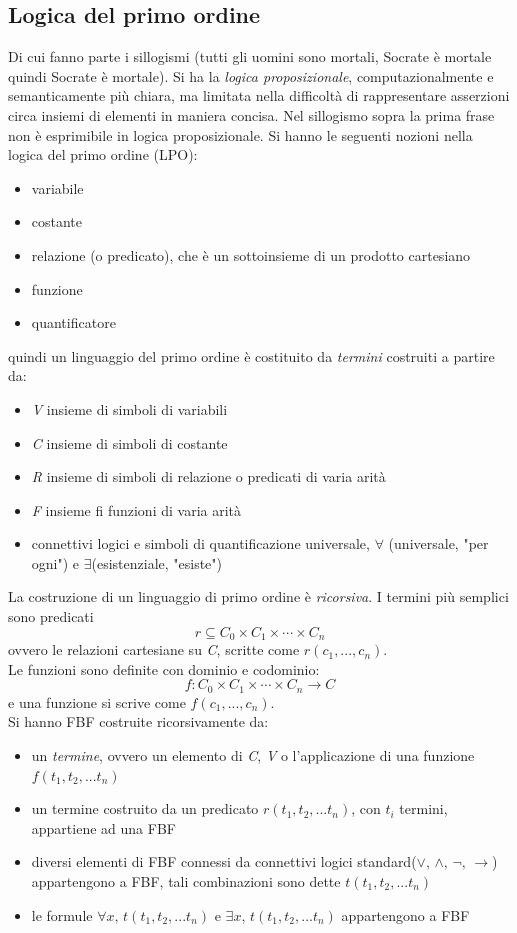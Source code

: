 \documentclass[a4paper,12pt, oneside]{book}
\begin{document}
\subsection{Logica del primo ordine}
Di cui fanno parte i sillogismi (tutti gli uomini sono mortali, Socrate è mortale quindi Socrate è mortale). Si ha la \textit{logica proposizionale}, computazionalmente e semanticamente più chiara, ma limitata nella difficoltà di rappresentare asserzioni circa insiemi di elementi in maniera concisa. Nel sillogismo sopra la prima frase non è esprimibile in logica proposizionale. Si hanno le seguenti nozioni nella logica del primo ordine (LPO):
\begin{itemize}
	\item variabile
	\item costante
	\item relazione (o predicato), che è un sottoinsieme di un prodotto cartesiano
	\item funzione
	\item quantificatore
\end{itemize}
quindi un linguaggio del primo ordine è costituito da \textit{termini} costruiti a partire da:
\begin{itemize}
	\item \textit{V} insieme di simboli di variabili
	\item \textit{C} insieme di simboli di costante
	\item \textit{R} insieme di simboli di relazione o predicati di varia arità
	\item \textit{F} insieme fi funzioni di varia arità
	\item connettivi logici e simboli di quantificazione universale, $\forall$ (universale, "per ogni") e $\exists$(esistenziale, "esiste")
\end{itemize}
La costruzione di un linguaggio di primo ordine è \textit{ricorsiva}. I termini più semplici sono predicati
$$r\subseteq C_0\times C_1\times\cdots\times C_n$$
ovvero le relazioni cartesiane su \textit{C}, scritte come $r(c_1,...,c_n)$.\\
Le funzioni sono definite con dominio e codominio:
$$f:C_0\times C_1\times\cdots\times C_n\to C$$
e una funzione si scrive come $f(c_1,...,c_n)$.\\
Si hanno FBF costruite ricorsivamente da:
\begin{itemize}
	\item un \textit{termine}, ovvero un elemento di \textit{C}, \textit{V} o l'applicazione di una funzione $f(t_1,t_2,...t_n)$
	\item un termine costruito da un predicato $r(t_1,t_2,...t_n)$, con $t_i$ termini, appartiene ad una FBF
	\item diversi elementi di FBF connessi da connettivi logici standard($\vee,\,\wedge,\,\neg,\,\to$) appartengono a FBF, tali combinazioni sono dette $t(t_1,t_2,...t_n)$
	\item le formule $\forall x,\,t(t_1,t_2,...t_n)$ e $\exists x,\,t(t_1,t_2,...t_n)$ appartengono a FBF
\end{itemize}
\end{document}
